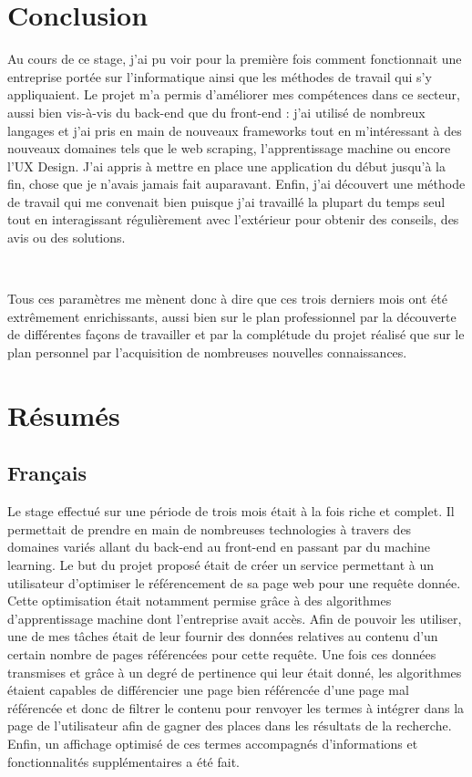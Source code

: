 \documentclass[12pt]{article}
\begin{document}

\newpage
\section{Conclusion}

Au cours de ce stage, j'ai pu voir pour la première fois comment fonctionnait une entreprise portée sur l'informatique ainsi que les méthodes de travail qui s'y appliquaient. Le projet m'a permis d'améliorer mes compétences dans ce secteur, aussi bien vis-à-vis du back-end que du front-end : j'ai utilisé de nombreux langages et j'ai pris en main de nouveaux frameworks tout en m'intéressant à des nouveaux domaines tels que le web scraping, l'apprentissage machine ou encore l'UX Design. J'ai appris à mettre en place une application du début jusqu'à la fin, chose que je n'avais jamais fait auparavant. Enfin, j'ai découvert une méthode de travail qui me convenait bien puisque j'ai travaillé la plupart du temps seul tout en interagissant régulièrement avec l'extérieur pour obtenir des conseils, des avis ou des solutions.

\

Tous ces paramètres me mènent donc à dire que ces trois derniers mois ont été extrêmement enrichissants, aussi bien sur le plan professionnel par la découverte de différentes façons de travailler et par la complétude du projet réalisé que sur le plan personnel par l'acquisition de nombreuses nouvelles connaissances.


\newpage
\section{Résumés}

\subsection{Français}

Le stage effectué sur une période de trois mois était à la fois riche et complet. Il permettait de prendre en main de nombreuses technologies à travers des domaines variés allant du back-end au front-end en passant par du machine learning. Le but du projet proposé était de créer un service permettant à un utilisateur d'optimiser le référencement de sa page web pour une requête donnée. Cette optimisation était notamment permise grâce à des algorithmes d'apprentissage machine dont l'entreprise avait accès. Afin de pouvoir les utiliser, une de mes tâches était de leur fournir des données relatives au contenu d'un certain nombre de pages référencées pour cette requête. Une fois ces données transmises et grâce à un degré de pertinence qui leur était donné, les algorithmes étaient capables de différencier une page bien référencée d'une page mal référencée et donc de filtrer le contenu pour renvoyer les termes à intégrer dans la page de l'utilisateur afin de gagner des places dans les résultats de la recherche. Enfin, un affichage optimisé de ces termes accompagnés d'informations et fonctionnalités supplémentaires a été fait.
\end{document}
